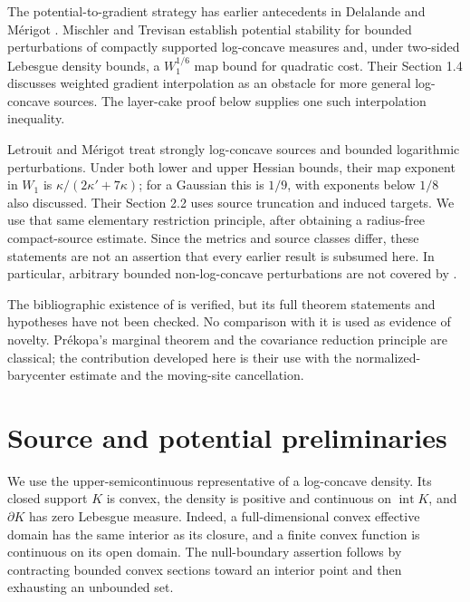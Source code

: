 \documentclass[11pt]{article}
\numberwithin{equation}{section}
\theoremstyle{remark}
\newcommand{\interior}{\operatorname{int}}
\begin{document}
The potential-to-gradient strategy has earlier antecedents in Delalande and M\'erigot \cite{DelalandeMerigot2023}. Mischler and Trevisan \cite[Theorems 1.1--1.2]{MischlerTrevisan2026} establish potential stability for bounded perturbations of compactly supported log-concave measures and, under two-sided Lebesgue density bounds, a $W_1^{1/6}$ map bound for quadratic cost. Their Section 1.4 discusses weighted gradient interpolation as an obstacle for more general log-concave sources. The layer-cake proof below supplies one such interpolation inequality.

Letrouit and M\'erigot \cite[Theorem 1.4]{LetrouitMerigot2026} treat strongly log-concave sources and bounded logarithmic perturbations. Under both lower and upper Hessian bounds, their map exponent in $W_1$ is $\kappa/(2\kappa'+7\kappa)$; for a Gaussian this is $1/9$, with exponents below $1/8$ also discussed. Their Section 2.2 uses source truncation and induced targets. We use that same elementary restriction principle, after obtaining a radius-free compact-source estimate. Since the metrics and source classes differ, these statements are not an assertion that every earlier result is subsumed here. In particular, arbitrary bounded non-log-concave perturbations are not covered by .

The bibliographic existence of \cite{Merigot2026} is verified, but its full theorem statements and hypotheses have not been checked. No comparison with it is used as evidence of novelty. Pr\'ekopa's marginal theorem \cite{Prekopa1973} and the covariance reduction principle \cite{KanterProppe1977} are classical; the contribution developed here is their use with the normalized-barycenter estimate and the moving-site cancellation.

\section{Source and potential preliminaries}\label{sec:prelim}
We use the upper-semicontinuous representative of a log-concave density. Its closed support $K$ is convex, the density is positive and continuous on $\interior K$, and $\partial K$ has zero Lebesgue measure. Indeed, a full-dimensional convex effective domain has the same interior as its closure, and a finite convex function is continuous on its open domain. The null-boundary assertion follows by contracting bounded convex sections toward an interior point and then exhausting an unbounded set.
\end{document}
